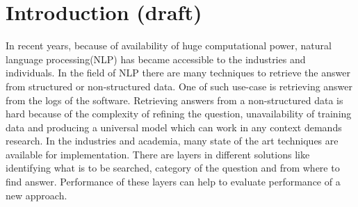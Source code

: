 
\chapter{Introduction (draft)}
\label{introduction}

In recent years, because of availability of huge computational power, natural language processing(NLP) has became accessible to the industries and individuals. In the field of NLP there are many techniques to retrieve the answer from structured or non-structured data. One of such use-case is retrieving answer from the logs of the software. 
Retrieving answers from a non-structured data is hard because of the complexity of refining the question, unavailability of training data and producing a universal model which can work in any context demands research.
In the industries and academia, many state of the art techniques are available for implementation. There are layers in different solutions like identifying what is to be searched, category of the question and from where to find answer. Performance of these layers can help to evaluate performance of a new approach.